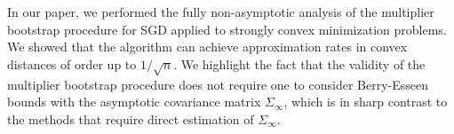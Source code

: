 In our paper, we performed the fully non-asymptotic analysis of the multiplier bootstrap procedure for SGD applied to strongly convex minimization problems. We showed that the algorithm can achieve approximation rates in convex distances of order up to $1/\sqrt{n}$. We highlight the fact that the validity of the multiplier bootstrap procedure does not require one to consider Berry-Esseen bounds with the asymptotic covariance matrix $\Sigma_{\infty}$, which is in sharp contrast to the methods that require direct estimation of $\Sigma_{\infty}$.